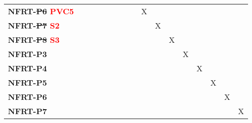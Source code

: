 \documentclass[12pt, titlepage]{article}
\begin{document}
\begin{landscape}
\begin{longtable}{|l|ccccccccccccc|}
		\textbf{NFRT-\sout{P6} \textcolor{red}{PVC5}} & ~                                                         & ~             & ~             & ~             & ~             & X             & ~             & ~             & ~             & ~             & ~ & ~ & ~ \\
		\textbf{NFRT-\sout{P7} \textcolor{red}{S2}} & ~                                                         & ~             & ~             & ~             & ~             & ~             & X             & ~             & ~             & ~             & ~ & ~ & ~ \\
		\textbf{NFRT-\sout{P8} \textcolor{red}{S3}} & ~                                                         & ~             & ~             & ~             & ~             & ~             & ~             & X             & ~             & ~             & ~ & ~ & ~ \\
		\textbf{NFRT-P3} & ~                                                         & ~             & ~             & ~             & ~             & ~             & ~             & ~             & X             & ~             & ~ & ~ & ~ \\
		\textbf{NFRT-P4} & ~                                                         & ~             & ~             & ~             & ~             & ~             & ~             & ~             & ~             & X             & ~ & ~ & ~ \\
		\textbf{NFRT-P5} & ~                                                         & ~             & ~             & ~             & ~             & ~             & ~             & ~             & ~             & ~             & X & ~ & ~ \\
		\textbf{NFRT-P6} & ~                                                         & ~             & ~             & ~             & ~             & ~             & ~             & ~             & ~             & ~             & ~ & X & ~ \\
		\textbf{NFRT-P7} & ~                                                         & ~             & ~             & ~             & ~             & ~             & ~             & ~             & ~             & ~             & ~ & ~ & X \\
		\hline
	\end{longtable}

	\newpage
	

\end{landscape}
\end{document}
